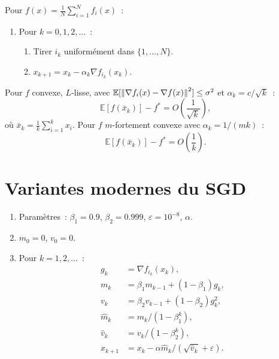 \begin{algorithme}[title=\textbf{Descente de gradient stochastique}]
Pour $f(x) = \frac{1}{N}\sum_{i=1}^N f_i(x)$~:
\begin{enumerate}
    \item Pour $k = 0, 1, 2, \ldots$~:
    \begin{enumerate}
        \item Tirer $i_k$ uniform\'ement dans $\{1, \ldots, N\}$.
        \item $x_{k+1} = x_k - \alpha_k \nabla f_{i_k}(x_k)$.
    \end{enumerate}
\end{enumerate}
\end{algorithme}

\begin{theoreme}
Pour $f$ convexe, $L$-lisse, avec $\mathbb{E}[\left\| \nabla f_i(x) - \nabla f(x) \right\|^2] \leq \sigma^2$
et $\alpha_k = c/\sqrt{k}$~:
\[
    \mathbb{E}[f(\bar{x}_k)] - f^* = O\left(\frac{1}{\sqrt{k}}\right),
\]
o\`u $\bar{x}_k = \frac{1}{k}\sum_{i=1}^k x_i$.
Pour $f$ $m$-fortement convexe avec $\alpha_k = 1/(mk)$~:
\[
    \mathbb{E}[f(\bar{x}_k)] - f^* = O\left(\frac{1}{k}\right).
\]
\end{theoreme}

\section{Variantes modernes du SGD}

\begin{algorithme}[title=\textbf{Adam (Kingma \& Ba, 2015)}]
\begin{enumerate}
    \item Param\`etres~: $\beta_1 = 0.9$, $\beta_2 = 0.999$, $\varepsilon = 10^{-8}$, $\alpha$.
    \item $m_0 = 0$, $v_0 = 0$.
    \item Pour $k = 1, 2, \ldots$~:
    \begin{align*}
        g_k &= \nabla f_{i_k}(x_k), \\
        m_k &= \beta_1 m_{k-1} + (1-\beta_1) g_k, \\
        v_k &= \beta_2 v_{k-1} + (1-\beta_2) g_k^2, \\
        \hat{m}_k &= m_k / (1 - \beta_1^k), \\
        \hat{v}_k &= v_k / (1 - \beta_2^k), \\
        x_{k+1} &= x_k - \alpha \hat{m}_k / (\sqrt{\hat{v}_k} + \varepsilon).
    \end{align*}
\end{enumerate}
\end{algorithme}

